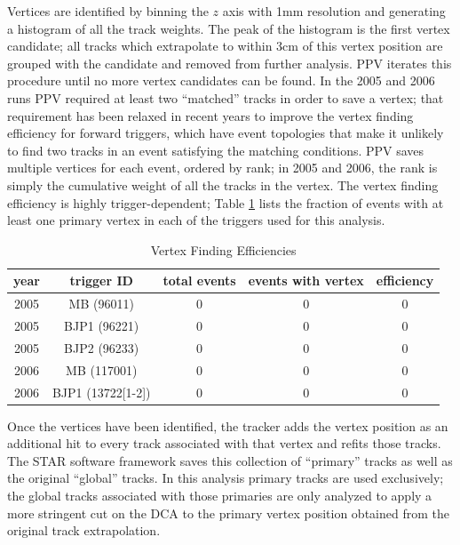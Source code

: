 Vertices are identified by binning the $z$ axis with 1mm resolution and generating a histogram of all the track weights.  The peak of the histogram is the first vertex candidate; all tracks which extrapolate to within 3cm of this vertex position are grouped with the candidate and removed from further analysis.  PPV iterates this procedure until no more vertex candidates can be found. In the 2005 and 2006 runs PPV required at least two ``matched'' tracks in order to save a vertex; that requirement has been relaxed in recent years to improve the vertex finding efficiency for forward triggers, which have event topologies that make it unlikely to find two tracks in an event satisfying the matching conditions.  PPV saves multiple vertices for each event, ordered by rank; in 2005 and 2006, the rank is simply the cumulative weight of all the tracks in the vertex.  The vertex finding efficiency is highly trigger-dependent; Table \ref{tbl:vertex-finding-efficiencies} lists the fraction of events with at least one primary vertex in each of the triggers used for this analysis.

\begin{table}
  \begin{center}
    \begin{tabular}{cc|ccc}
      \hline
      year & trigger ID & total events & events with vertex & efficiency\\
      \hline
      \hline
      2005 & MB (96011) & 0 & 0 & 0\\
      \hline
      2005 & BJP1 (96221) & 0 & 0 & 0\\
      \hline
      2005 & BJP2 (96233) & 0 & 0 & 0\\
      \hline
      2006 & MB (117001) & 0 & 0 & 0\\
      \hline
      2006 & BJP1 (13722[1-2]) & 0 & 0 & 0\\
      \hline
    \end{tabular}
  \end{center}
  \caption{Vertex Finding Efficiencies}
  \label{tbl:vertex-finding-efficiencies}
\end{table}

Once the vertices have been identified, the tracker adds the vertex position as an additional hit to every track associated with that vertex and refits those tracks.  The STAR software framework saves this collection of ``primary'' tracks as well as the original ``global'' tracks.  In this analysis primary tracks are used exclusively; the global tracks associated with those primaries are only analyzed to apply a more stringent cut on the DCA to the primary vertex position obtained from the original track extrapolation.


